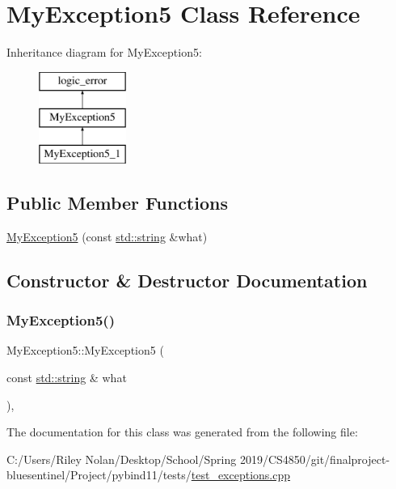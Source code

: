\hypertarget{class_my_exception5}{}\section{My\+Exception5 Class Reference}
\label{class_my_exception5}
Inheritance diagram for My\+Exception5\+:\begin{figure}[H]
\begin{center}
\leavevmode
\includegraphics[height=3.000000cm]{class_my_exception5}
\end{center}
\end{figure}
\subsection*{Public Member Functions}
\begin{DoxyCompactItemize}
\item 
\mbox{\hyperlink{class_my_exception5_a10ef0850e42ccce182bbc1e9021f5369}{My\+Exception5}} (const \mbox{\hyperlink{_s_d_l__opengl__glext_8h_ab4ccfaa8ab0e1afaae94dc96ef52dde1}{std\+::string}} \&what)
\end{DoxyCompactItemize}


\subsection{Constructor \& Destructor Documentation}
\mbox{\label{class_my_exception5_a10ef0850e42ccce182bbc1e9021f5369}} 
\subsubsection{\texorpdfstring{MyException5()}{MyException5()}}
{\footnotesize\ttfamily My\+Exception5\+::\+My\+Exception5 (\begin{DoxyParamCaption}\item[{const \mbox{\hyperlink{_s_d_l__opengl__glext_8h_ab4ccfaa8ab0e1afaae94dc96ef52dde1}{std\+::string}} \&}]{what }\end{DoxyParamCaption})\hspace{0.3cm}{\ttfamily [inline]}, {\ttfamily [explicit]}}



The documentation for this class was generated from the following file\+:\begin{DoxyCompactItemize}
\item 
C\+:/\+Users/\+Riley Nolan/\+Desktop/\+School/\+Spring 2019/\+C\+S4850/git/finalproject-\/bluesentinel/\+Project/pybind11/tests/\mbox{\hyperlink{test__exceptions_8cpp}{test\+\_\+exceptions.\+cpp}}\end{DoxyCompactItemize}
